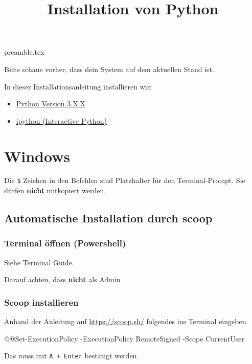 \RequirePackage{import}
{preamble.tex}
\usepackage{hyperref}
\title{Installation von Python}


\maketitle

Bitte schaue vorher, dass dein System auf dem aktuellen Stand ist.

In dieser Installationsanleitung installieren wir:
\begin{itemize}
    \item \href{https://www.python.org/}{Python Version 3.X.X}
    \item \href{https://ipython.org/}{ipython (\underline{I}nteractive \underline{P}ython)}
\end{itemize}

\section*{Windows}
\begin{hinweis}
    Die \verb+$+ Zeichen in den Befehlen sind Platzhalter für den Terminal-Prompt. Sie dürfen \textbf{nicht} mitkopiert werden.
\end{hinweis}
\subsection*{Automatische Installation durch scoop}

\subsubsection*{Terminal öffnen (Powershell)}
Siehe Terminal Guide.

Darauf achten, dass \textbf{nicht} als Admin

\subsubsection*{Scoop installieren}
Anhand der Anleitung auf \url{https://scoop.sh/} folgendes ins Terminal eingeben.
\begin{commandshell}
@\shellprefix{}@Set-ExecutionPolicy -ExecutionPolicy RemoteSigned -Scope CurrentUser
\end{commandshell}
Das muss mit \verb#A + Enter# bestätigt werden.

